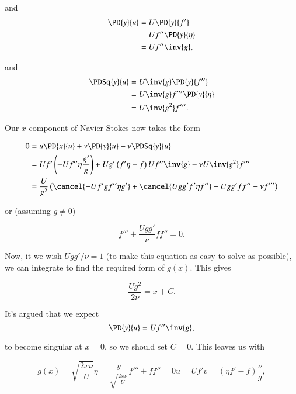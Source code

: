 and
\begin{align*}
\PD{y}{u} 
&=
U \PD{y}{ f' } \\
&=
U f'' \PD{y}{\eta} \\
&=
U f'' \inv{g},
\end{align*}

and
\begin{align*}
\PDSq{y}{u} 
&=
U \inv{g} \PD{y}{f''} \\
&=
U \inv{g} f''' \PD{y}{\eta} \\
&=
U \inv{g^2} f'''.
\end{align*}

Our $x$ component of Navier-Stokes now takes the form

\begin{align*}
0 &=
u \PD{x}{u}
+
v \PD{y}{u}
-
\nu 
\PDSq{y}{u} \\
&=
U f' \left( 
-U f'' \eta \frac{g'}{g}
\right)
+
U g' \left( f' \eta - f \right)
U f'' \inv{g}
- 
\nu
U \inv{g^2} f''' \\
&=
\frac{U}{g^2}
\left( 
\cancel{-U f' g f'' \eta g' }
+
\cancel{U g g' f' \eta f''}
-
U g g' f f'' 
- 
\nu
f'''
\right)
\end{align*}

or (assuming $g \ne 0$)

\begin{equation}\label{eqn:continuumL19:910}
f''' + \frac{U g g' }{\nu} f f'' = 0.
\end{equation}

Now, it we wish $U g g'/\nu = 1$ (to make this equation as easy to solve as possible), we can integrate to find the required form of $g(x)$.  This gives

\begin{equation}\label{eqn:continuumL19:930}
\frac{U g^2 }{2 \nu} = x + C.
\end{equation}

It's argued that we expect 
\begin{equation}\label{eqn:continuumL19:950}
\PD{y}{u} = U f'' \inv{g},
\end{equation}

to become singular at $x = 0$, so we should set $C = 0$.  This leaves us with

\begin{subequations}
\begin{equation}\label{eqn:continuumL19:970}
g(x) = \sqrt{\frac{2 x \nu}{U}}
\end{equation}
\begin{equation}\label{eqn:continuumL19:990}
\eta = \frac{y}{\sqrt{\frac{2 x \nu}{U}}}
\end{equation}
\begin{equation}\label{eqn:continuumL19:1010}
f''' + f f'' = 0
\end{equation}
\begin{equation}\label{eqn:continuumL19:1030}
u = U f'
\end{equation}
\begin{equation}\label{eqn:continuumL19:1050}
v = (\eta f' - f) \frac{\nu}{g},
\end{equation}
\end{subequations}

